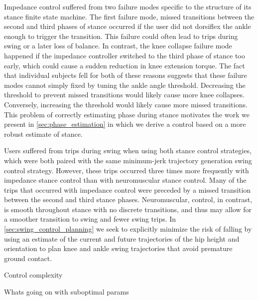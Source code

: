 Impedance control suffered from two failure modes specific to the structure of
its stance finite state machine. The first failure mode, missed transitions
between the second and third phases of stance occurred if the user did not
dorsiflex the ankle enough to trigger the transition. This failure could often
lead to trips during swing or a later loss of balance. In contrast, the knee
collapse failure mode happened if the impedance controller switched to the third
phase of stance too early, which could cause a sudden reduction in knee
extension torque. The fact that individual subjects fell for both of these
reasons suggests that these failure modes cannot simply fixed by tuning the
ankle angle threshold. Decreasing the threshold to prevent missed transitions
would likely cause more knee collapses. Conversely, increasing the threshold
would likely cause more missed transitions. This problem of correctly estimating
phase during stance motivates the work we present in \cref{sec:phase_estimation}
in which we derive a control based on a more robust estimate of stance.

Users suffered from trips during swing when using both stance control
strategies, which were both paired with the same minimum-jerk trajectory
generation swing control strategy. However, these trips occurred three times
more frequently with impedance stance control than with neuromuscular stance
control. Many of the trips that occurred with impedance control were preceded by
a missed transition between the second and third stance phases. Neuromuscular,
control, in contrast, is smooth throughout stance with no discrete transitions,
and thus may allow for a smoother transition to swing and fewer swing trips. In
\cref{sec:swing_control_planning} we seek to explicitly minimize the risk of
falling by using an estimate of the current and future trajectories of the hip
height and orientation to plan knee and ankle swing trajectories that avoid
premature ground contact.

Control complexity 

Whats going on with suboptimal params



